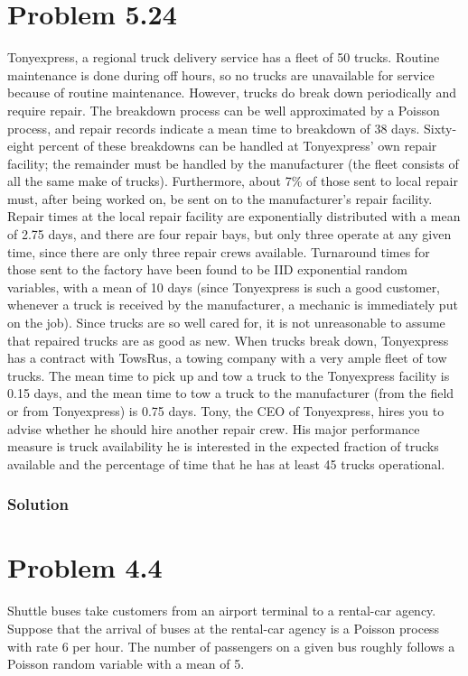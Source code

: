 \documentclass[letterpaper]{amsart}
\begin{document}
\section{Problem 5.24} %
Tonyexpress, a regional truck delivery service has a fleet of 50 trucks.
Routine maintenance is done during off hours, so no trucks are unavailable
for service because of routine maintenance. However, trucks do break
down periodically and require repair. The breakdown process can be well
approximated by a Poisson process, and repair records indicate a mean
time to breakdown of 38 days. Sixty-eight percent of these breakdowns
can be handled at Tonyexpress’ own repair facility; the remainder must be
handled by the manufacturer (the fleet consists of all the same make of
trucks). Furthermore, about 7\% of those sent to local repair must, after
being worked on, be sent on to the manufacturer’s repair facility. Repair
times at the local repair facility are exponentially distributed with a mean
of 2.75 days, and there are four repair bays, but only three operate at any
given time, since there are only three repair crews available. Turnaround
times for those sent to the factory have been found to be IID exponential
random variables, with a mean of 10 days (since Tonyexpress is such a good
customer, whenever a truck is received by the manufacturer, a mechanic
is immediately put on the job). Since trucks are so well cared for, it is
not unreasonable to assume that repaired trucks are as good as new. When
trucks break down, Tonyexpress has a contract with TowsRus, a towing
company with a very ample fleet of tow trucks. The mean time to pick up
and tow a truck to the Tonyexpress facility is 0.15 days, and the mean time
to tow a truck to the manufacturer (from the field or from Tonyexpress) is
0.75 days. Tony, the CEO of Tonyexpress, hires you to advise whether he
should hire another repair crew. His major performance measure is truck
availability he is interested in the expected fraction of trucks available and
the percentage of time that he has at least 45 trucks operational.
\subsubsection*{Solution}

\section{Problem 4.4} %
Shuttle buses take customers from an airport terminal to a rental-car agency.
Suppose that the arrival of buses at the rental-car agency is a Poisson process
with rate 6 per hour. The number of passengers on a given bus roughly
follows a Poisson random variable with a mean of 5.
\end{document}
